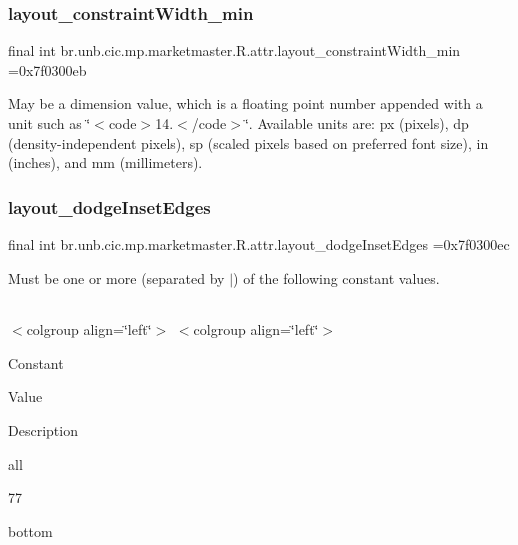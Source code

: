 \subsubsection{\texorpdfstring{layout\+\_\+constraint\+Width\+\_\+min}{layout\_constraintWidth\_min}}
{\footnotesize\ttfamily final int br.\+unb.\+cic.\+mp.\+marketmaster.\+R.\+attr.\+layout\+\_\+constraint\+Width\+\_\+min =0x7f0300eb\hspace{0.3cm}{\ttfamily [static]}}

May be a dimension value, which is a floating point number appended with a unit such as \char`\"{}$<$code$>$14.\+5sp$<$/code$>$\char`\"{}. Available units are\+: px (pixels), dp (density-\/independent pixels), sp (scaled pixels based on preferred font size), in (inches), and mm (millimeters). \mbox{\label{classbr_1_1unb_1_1cic_1_1mp_1_1marketmaster_1_1R_1_1attr_a19ba64bde852d0ab0f3c315a4448eefa}} 
\subsubsection{\texorpdfstring{layout\+\_\+dodge\+Inset\+Edges}{layout\_dodgeInsetEdges}}
{\footnotesize\ttfamily final int br.\+unb.\+cic.\+mp.\+marketmaster.\+R.\+attr.\+layout\+\_\+dodge\+Inset\+Edges =0x7f0300ec\hspace{0.3cm}{\ttfamily [static]}}

Must be one or more (separated by \textquotesingle{}$\vert$\textquotesingle{}) of the following constant values.

\tabulinesep=1mm
\begin{longtabu} spread 0pt [c]{*{0}{|X[-1]}|}
\hline
\end{longtabu}
$<$colgroup align=\char`\"{}left\char`\"{}$>$ $<$colgroup align=\char`\"{}left\char`\"{}$>$ 

Constant

Value

Description 

all

77

bottom

